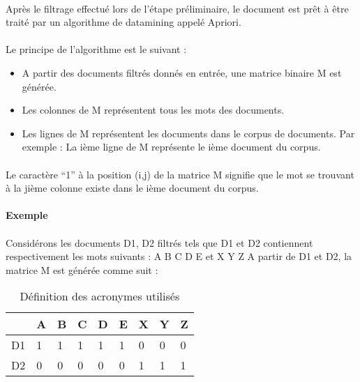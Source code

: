 \documentclass[12pt, a4paper, oneside]{book}
\begin{document}
\paragraph{} 
Après le filtrage effectué lors de l'étape préliminaire, le document est prêt à être traité par un algorithme de datamining appelé Apriori.\citep{apriori} \\ \\
Le principe de l'algorithme est le suivant : \\
\begin{itemize}

\item A partir des documents filtrés donnés en entrée, une matrice binaire M est générée.\\
\item Les colonnes de M représentent tous les mots des documents.\\
\item Les lignes de M représentent les documents dans le corpus de documents. Par exemple : La ième ligne de M représente le ième document du corpus.

\end{itemize}

\paragraph{}
Le caractère “1” à la position (i,j) de la matrice M signifie que le mot se trouvant à la jième colonne existe dans le ième document du corpus.
\paragraph{}
\textbf{Exemple}\\ \\
Considérons les documents D1, D2  filtrés tels que D1 et D2 contiennent respectivement les mots suivants : 
A B C D E et X Y Z 
A partir de D1 et D2, la matrice M est générée comme suit :


\begin{table}[h!]
\centering
\begin{tabular}{| l | l | l | l | l | l | l | l | l |}
 \hline
 & A & B & C & D & E & X & Y & Z \\
 \hline
 D1 & 1 & 1 & 1 & 1 & 1 & 0 & 0 & 0 \\
 \hline
 D2 & 0 & 0 & 0 & 0 & 0 & 1 & 1 & 1 \\
 \hline
 
\end{tabular}
\caption{Définition des acronymes utilisés}
\end{table}
 
\end{document}
